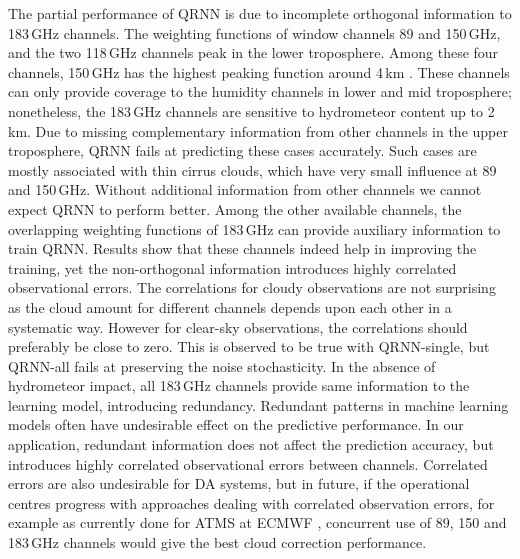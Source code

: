 \documentclass[amt, manuscript]{copernicus}
\begin{document}
The partial performance of QRNN is due to incomplete orthogonal information to 183\,GHz channels. The weighting functions of window channels 89 and 150\,GHz, and the two 118\,GHz channels peak in the lower troposphere. Among these four channels, 150\,GHz has the highest peaking function around 4\,km \citep{chen2020mwhs}. These channels can only provide coverage to the humidity channels in lower and mid troposphere; nonetheless, the 183\,GHz channels are sensitive to hydrometeor content up to 2\,km. Due to missing complementary information from other channels in the upper troposphere, QRNN fails at predicting these cases accurately. Such cases are mostly associated with thin cirrus clouds, which have very small influence at 89 and 150\,GHz. Without additional information from other channels we cannot expect QRNN to perform better. Among the other available channels, the overlapping weighting functions of 183\,GHz can provide auxiliary information to train QRNN. Results show that these channels indeed help in improving the training, yet the non-orthogonal information introduces highly correlated observational errors. The correlations for cloudy observations are not surprising as the cloud amount for different channels depends upon each other in a systematic way. However for clear-sky observations, the correlations should preferably be close to zero. This is observed to be true with QRNN-single, but QRNN-all fails at preserving the noise stochasticity. In the absence of hydrometeor impact, all 183\,GHz channels provide same information to the learning model, introducing redundancy. Redundant patterns in machine learning models often have undesirable effect on the predictive performance. In our application, redundant information does not affect the prediction accuracy, but introduces highly correlated observational errors between channels. Correlated errors are also undesirable for DA systems, but in future, if the operational centres progress with approaches dealing with correlated observation errors, for example as currently done for ATMS at ECMWF \citep{Weston2018eumATMS}, concurrent use of 89, 150 and 183\,GHz channels would give the best cloud correction performance.
\end{document}
